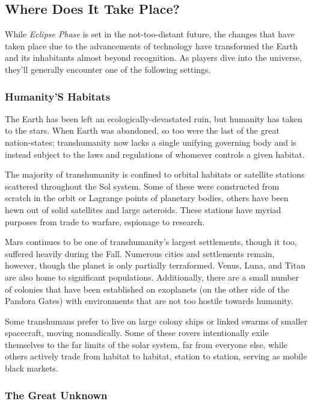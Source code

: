 \subsection{Where Does It Take Place?}

While  \textit{Eclipse Phase} is set in the not-too-distant 
future, the changes that have taken place due to the 
advancements of technology have transformed the 
Earth and its inhabitants almost beyond recognition. 
As players dive into the universe, they'll generally 
encounter one of the following settings.

\subsubsection{Humanity'S Habitats}

The Earth has been left an ecologically-devastated 
ruin, but humanity has taken to the stars. When 
Earth was abandoned, so too were the last of the 
great nation-states; transhumanity now lacks 
a single unifying governing body and is instead 
subject to the laws and regulations of whomever 
controls a given habitat.

The majority of transhumanity is confined to 
orbital habitats or satellite stations scattered 
throughout the Sol system. Some of these were 
constructed from scratch in the orbit or Lagrange 
points of planetary bodies, others have been hewn 
out of solid satellites and large asteroids. These stations have myriad purposes from trade to warfare, 
espionage to research.

Mars continues to be one of transhumanity's 
largest settlements, though it too, suffered heavily 
during the Fall. Numerous cities and settlements 
remain, however, though the planet is only partially 
terraformed. Venus, Luna, and Titan are also home 
to significant populations. Additionally, there are a 
small number of colonies that have been established 
on exoplanets (on the other side of the Pandora 
Gates) with environments that are not too hostile 
towards humanity.

Some transhumans prefer to live on large colony 
ships or linked swarms of smaller spacecraft, moving 
nomadically. Some of these rovers intentionally exile 
themselves to the far limits of the solar system, far 
from everyone else, while others actively trade from 
habitat to habitat, station to station, serving as 
mobile black markets.

\subsubsection{The Great Unknown}


